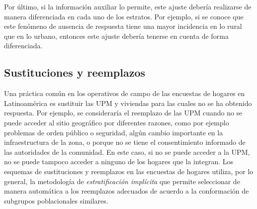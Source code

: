 \documentclass[12pt,spanish,]{book}
\begin{document}
Por último, si la información auxiliar lo permite, este ajuste debería realizarse de manera diferenciada en cada uno de los estratos. Por ejemplo, si se conoce que este fenómeno de ausencia de respuesta tiene una mayor incidencia en lo rural que en lo urbano, entonces este ajuste debería tenerse en cuenta de forma diferenciada.

\hypertarget{sustituciones-y-reemplazos}{%
\subsection{Sustituciones y reemplazos}\label{sustituciones-y-reemplazos}}

Una práctica común en los operativos de campo de las encuestas de hogares en Latinoamérica es sustituir las UPM y viviendas para las cuales no se ha obtenido respuesta. Por ejemplo, se consideraría el reemplazo de las UPM cuando no se puede acceder al sitio geográfico por diferentes razones, como por ejemplo problemas de orden público o seguridad, algún cambio importante en la infraestructura de la zona, o porque no se tiene el consentimiento informado de las autoridades de la comunidad. En este caso, si no se puede acceder a la UPM, no se puede tampoco acceder a ninguno de los hogares que la integran. Los esquemas de sustituciones y reemplazos en las encuestas de hogares utiliza, por lo general, la metodología de \emph{estratificación implícita} que permite seleccionar de manera automática a los reemplazos adecuados de acuerdo a la conformación de subgrupos poblacionales similares.
\end{document}
